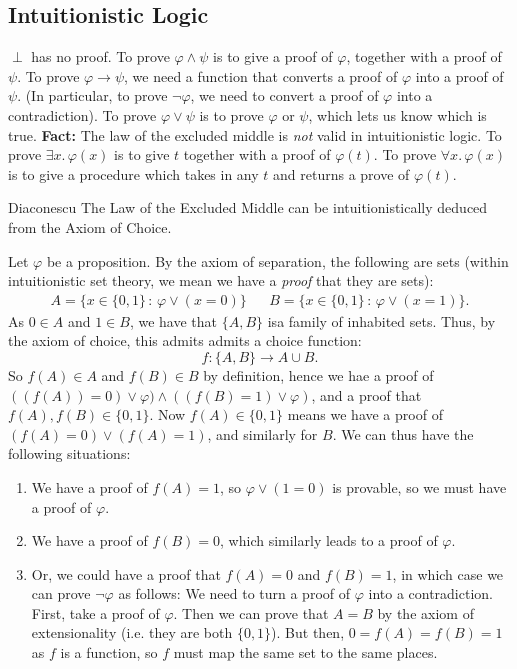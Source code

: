 \documentclass{article}
\numberwithin{thm}{subsection}
\begin{document}
\subsection{Intuitionistic Logic}
$\perp$ has no proof. \gap 
To prove $\varphi \wedge \psi$ is to give a proof of $\varphi$, together with a proof of $\psi$. \gap 
To prove $\varphi \rightarrow \psi$, we need a function that converts a proof of $\varphi$ into a proof of $\psi$. (In particular, to prove $\neg \varphi$, we need to convert a proof of $\varphi$ into a contradiction).\gap 
To prove $\varphi \vee \psi$ is to prove $\varphi$ or $\psi$, which lets us know which is true. \gap 
\textbf{Fact:} The law of the excluded middle is \textit{not} valid in intuitionistic logic. \gap To prove $\exists x. \, \varphi(x)$ is to give $t$ together with a proof of $\varphi(t)$.\gap 
To prove $\forall x.\, \varphi(x)$ is to give a procedure which takes in any $t$ and returns a prove of $\varphi(t)$.
\begin{fancythm}{Diaconescu}
    The Law of the Excluded Middle can be intuitionistically deduced from the Axiom of Choice.
\end{fancythm}
\proof Let $\varphi$ be a proposition. By the axiom of separation, the following are sets (within intuitionistic set theory, we mean we have a \textit{proof} that they are sets):
\begin{align*}
    A = \{ x \in \{0,1\} \, : \, \varphi \vee (x=0) \} & & B = \{ x \in \{0,1\} \, : \, \varphi \vee (x=1) \}.
\end{align*}
As $0 \in A$ and $1 \in B$, we have that $\{A,B\}$ isa family of inhabited sets. Thus, by the axiom of choice, this admits admits a choice function: \[ f: \{A,B\} \to A \cup B.\] So $f(A) \in A$ and $f(B) \in B$ by definition, hence we hae a proof of $((f(A)) = 0) \vee \varphi) \wedge ((f(B) = 1) \vee \varphi)$, and a proof that $f(A),f(B) \in \{0,1\}$. Now $f(A) \in \{0,1\}$ means we have a proof of $(f(A)=0) \vee (f(A)=1)$, and similarly for $B$. We can thus have the following situations:
\begin{enumerate}
    \item We have a proof of $f(A)=1$, so $\varphi \vee (1=0)$ is provable, so we must have a proof of $\varphi$.
    \item We have a proof of $f(B)=0$, which similarly leads to a proof of $\varphi$.
    \item Or, we could have a proof that $f(A)=0$ and $f(B)=1$, in which case we can prove $\neg \varphi$ as follows: \gap We need to turn a proof of $\varphi$ into a contradiction. \gap 
    First, take a proof of $\varphi$. Then we can prove that $A=B$ by the axiom of extensionality (i.e. they are both $\{0,1\}$). But then, $0=f(A)=f(B)=1$ as $f$ is a function, so $f$ must map the same set to the same places.
\end{enumerate}
\endproof
\end{document}

